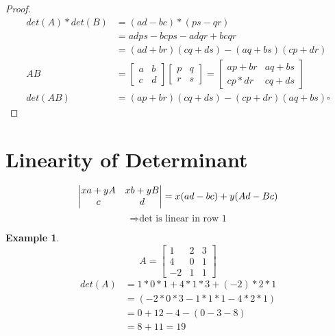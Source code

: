 \documentclass[12pt]{amsart}
\newtheorem{example}{Example}      %
\numberwithin{equation}{theorem}    %
\begin{document}
\begin{proof}
    \begin{align*}
        det(A)*det(B) & = (ad-bc) * (ps-qr)                                     \\
                      & = adps - bcps - adqr + bcqr                             \\
                      & = (ad+br)(cq+ds) - (aq+bs)(cp+dr)                       \\
        AB            & =  \begin{bmatrix}
            a & b \\
            c & d
        \end{bmatrix}\begin{bmatrix}
            p & q \\
            r & s
        \end{bmatrix}
        = \begin{bmatrix}
            ap+br & aq+bs \\
            cp*dr & cq+ds
        \end{bmatrix}                                            \\
        det(AB)       & = (ap+br)(cq+ds)-(cp+dr)(aq+bs) \square
    \end{align*}
\end{proof}

\section{Linearity of Determinant}

\begin{equation*}
    \begin{vmatrix}
        xa+yA & xb+yB \\
        c     & d
    \end{vmatrix}
    = x(ad-bc)+y(Ad-Bc) \\
\end{equation*}
$$\Rightarrow \text{det is linear in row 1}$$

\begin{example}
    \begin{equation*}
        A = \begin{bmatrix}
            1  & 2 & 3 \\
            4  & 0 & 1 \\
            -2 & 1 & 1
        \end{bmatrix}
    \end{equation*}
    \begin{align*}
        det(A) & = 1*0*1+4*1*3+(-2)*2*1     \\
               & = (-2*0*3 - 1*1*1 - 4*2*1) \\
               & = 0+12-4-(0-3-8)           \\
               & = 8+11 = 19
    \end{align*}
\end{example}
\end{document}
